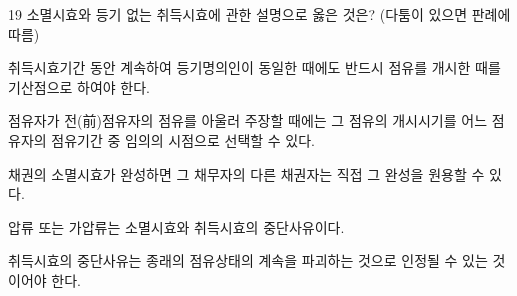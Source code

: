 \begin{question}{19}
소멸시효와 등기 없는 취득시효에 관한 설명으로 옳은 것은? (다툼이 있으면 판례에 따름)
\begin{choices}
  \item 취득시효기간 동안 계속하여 등기명의인이 동일한 때에도 반드시 점유를 개시한 때를 기산점으로 하여야 한다.
  \item 점유자가 전(前)점유자의 점유를 아울러 주장할 때에는 그 점유의 개시시기를 어느 점유자의 점유기간 중 임의의 시점으로 선택할 수 있다.
  \item 채권의 소멸시효가 완성하면 그 채무자의 다른 채권자는 직접 그 완성을 원용할 수 있다.
  \item 압류 또는 가압류는 소멸시효와 취득시효의 중단사유이다.
  \item 취득시효의 중단사유는 종래의 점유상태의 계속을 파괴하는 것으로 인정될 수 있는 것이어야 한다.
\end{choices}
\end{question}
